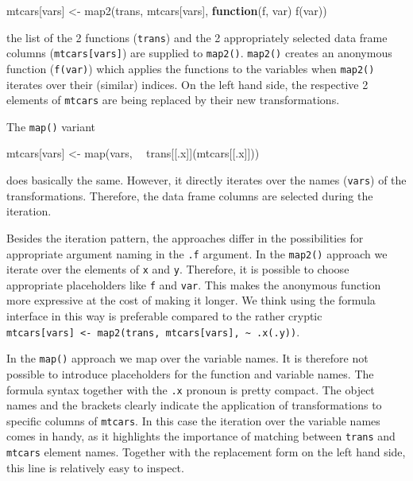 \documentclass[
]{krantz}
\makeatletter
\newenvironment{Shaded}{\begin{snugshade}}{\end{snugshade}}
\newcommand{\ControlFlowTok}[1]{\textcolor[rgb]{0.13,0.29,0.53}{\textbf{#1}}}
\newcommand{\KeywordTok}[1]{\textcolor[rgb]{0.13,0.29,0.53}{\textbf{#1}}}
\newcommand{\NormalTok}[1]{#1}
\newcommand{\OperatorTok}[1]{\textcolor[rgb]{0.81,0.36,0.00}{\textbf{#1}}}
\newcommand{\StringTok}[1]{\textcolor[rgb]{0.31,0.60,0.02}{#1}}
\newenvironment{kframe}{%
\medskip{}
\setlength{\fboxsep}{.8em}
 \def\at@end@of@kframe{}%
 \ifinner\ifhmode%
  \def\at@end@of@kframe{\end{minipage}}%
  \begin{minipage}{\columnwidth}%
 \fi\fi%
 \def\FrameCommand##1{\hskip\@totalleftmargin \hskip-\fboxsep
 \colorbox{shadecolor}{##1}\hskip-\fboxsep
     \hskip-\linewidth \hskip-\@totalleftmargin \hskip\columnwidth}%
 \MakeFramed {\advance\hsize-\width
   \@totalleftmargin\z@ \linewidth\hsize
   \@setminipage}}%
 {\par\unskip\endMakeFramed%
 \at@end@of@kframe}
\renewenvironment{Shaded}{\begin{kframe}}{\end{kframe}}
\renewcommand{\KeywordTok} [1]{\textcolor[rgb]{0.00,0.44,0.13}{{#1}}}
\renewcommand{\StringTok}  [1]{\textcolor[rgb]{0.25,0.44,0.63}{{#1}}}
\renewcommand{\NormalTok}  [1]{{#1}}
\makeatother
\begin{document}
\begin{Shaded}
\begin{Highlighting}[]
\NormalTok{mtcars[vars] <-}\StringTok{ }\KeywordTok{map2}\NormalTok{(trans, mtcars[vars], }\ControlFlowTok{function}\NormalTok{(f, var) }\KeywordTok{f}\NormalTok{(var))}
\end{Highlighting}
\end{Shaded}

the list of the 2 functions (\texttt{trans}) and the 2 appropriately selected data frame columns (\texttt{mtcars{[}vars{]}}) are supplied to \texttt{map2()}. \texttt{map2()} creates an anonymous function (\texttt{f(var)}) which applies the functions to the variables when \texttt{map2()} iterates over their (similar) indices. On the left hand side, the respective 2 elements of \texttt{mtcars} are being replaced by their new transformations.

The \texttt{map()} variant

\begin{Shaded}
\begin{Highlighting}[]
\NormalTok{mtcars[vars] <-}\StringTok{ }\KeywordTok{map}\NormalTok{(vars, }\OperatorTok{~}\StringTok{ }\NormalTok{trans[[.x]](mtcars[[.x]]))}
\end{Highlighting}
\end{Shaded}

does basically the same. However, it directly iterates over the names (\texttt{vars}) of the transformations. Therefore, the data frame columns are selected during the iteration.

Besides the iteration pattern, the approaches differ in the possibilities for appropriate argument naming in the \texttt{.f} argument. In the \texttt{map2()} approach we iterate over the elements of \texttt{x} and \texttt{y}. Therefore, it is possible to choose appropriate placeholders like \texttt{f} and \texttt{var}. This makes the anonymous function more expressive at the cost of making it longer. We think using the formula interface in this way is preferable compared to the rather cryptic \texttt{mtcars{[}vars{]}\ \textless{}-\ map2(trans,\ mtcars{[}vars{]},\ \textasciitilde{}\ .x(.y))}.

In the \texttt{map()} approach we map over the variable names. It is therefore not possible to introduce placeholders for the function and variable names. The formula syntax together with the \texttt{.x} pronoun is pretty compact. The object names and the brackets clearly indicate the application of transformations to specific columns of \texttt{mtcars}. In this case the iteration over the variable names comes in handy, as it highlights the importance of matching between \texttt{trans} and \texttt{mtcars} element names. Together with the replacement form on the left hand side, this line is relatively easy to inspect.
\end{document}
